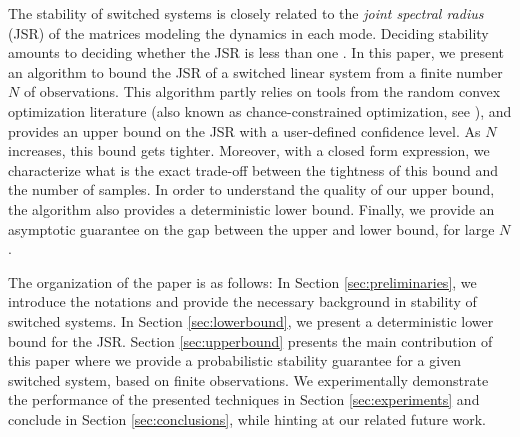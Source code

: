 The stability of switched systems is closely related to the \emph{joint spectral radius} (JSR) of the matrices modeling the dynamics in each mode. Deciding stability amounts to deciding whether the JSR is less than one \cite{jungersBook}. In this paper, we present an algorithm to bound the JSR of a switched linear system from a finite number $N$ of observations. This algorithm partly relies on tools from the random convex optimization literature (also known as chance-constrained optimization, see \cite{campi,nemirovski,campi-garatti}), and provides an upper bound on the JSR with a user-defined confidence level. As $N$ increases, this bound gets tighter. Moreover, with a closed form expression, we characterize what is the exact trade-off between the tightness of this bound and the number of samples. In order to understand the quality of our upper bound, the algorithm also provides a deterministic lower bound. Finally, we provide an asymptotic guarantee on the gap between the upper and lower bound, for large $N$.


The organization of the paper is as follows: In Section \ref{sec:preliminaries}, we introduce the notations and provide the necessary background in stability of switched systems. In Section \ref{sec:lowerbound}, we present a deterministic lower bound for the JSR. Section \ref{sec:upperbound} presents the main
contribution of this paper where we provide a probabilistic stability guarantee for a given switched system, based on finite observations. We experimentally demonstrate the performance of the presented techniques in Section \ref{sec:experiments} and conclude in Section \ref{sec:conclusions}, while hinting at our related future work.

